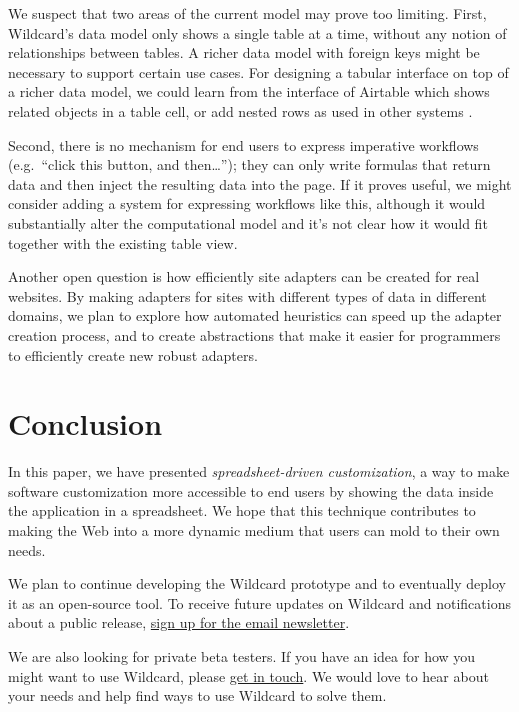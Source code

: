 \documentclass[english,submission]{programming}
\begin{document}
We suspect that two areas of the current model may prove too limiting.
First, Wildcard's data model only shows a single table at a time,
without any notion of relationships between tables. A richer data model
with foreign keys might be necessary to support certain use cases. For
designing a tabular interface on top of a richer data model, we could
learn from the interface of Airtable which shows related objects in a
table cell, or add nested rows as used in other systems
\autocite{mccutchen2016,bakke2016}.

Second, there is no mechanism for end users to express imperative
workflows (e.g.~``click this button, and then\ldots{}''); they can only
write formulas that return data and then inject the resulting data into
the page. If it proves useful, we might consider adding a system for
expressing workflows like this, although it would substantially alter
the computational model and it's not clear how it would fit together
with the existing table view.

Another open question is how efficiently site adapters can be created
for real websites. By making adapters for sites with different types of
data in different domains, we plan to explore how automated heuristics
can speed up the adapter creation process, and to create abstractions
that make it easier for programmers to efficiently create new robust
adapters.

\hypertarget{conclusion}{%
\section{Conclusion}\label{conclusion}}

In this paper, we have presented \emph{spreadsheet-driven
customization}, a way to make software customization more accessible to
end users by showing the data inside the application in a spreadsheet.
We hope that this technique contributes to making the Web into a more
dynamic medium that users can mold to their own needs.

We plan to continue developing the Wildcard prototype and to eventually
deploy it as an open-source tool. To receive future updates on Wildcard
and notifications about a public release, \href{}{sign up for the email
newsletter}.

We are also looking for private beta testers. If you have an idea for
how you might want to use Wildcard, please
\href{mailto:glitt@mit.edu}{get in touch}. We would love to hear about
your needs and help find ways to use Wildcard to solve them.

\acks
\printbibliography
\end{document}
